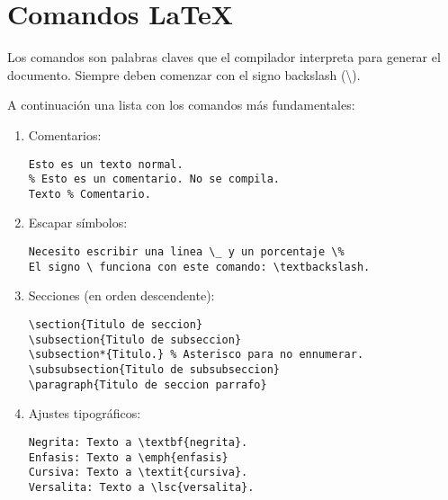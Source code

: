 
\section{Comandos \LaTeX}\label{anexo-latex:listado-comandos-latex}
Los comandos son palabras claves que el compilador interpreta para generar el documento. Siempre deben comenzar con el signo backslash (\textbackslash).

\noindent A continuación una lista con los comandos más fundamentales:

\begin{enumerate}
\item Comentarios:
\lstset{style=latex}
\begin{lstlisting}
Esto es un texto normal.
% Esto es un comentario. No se compila.
Texto % Comentario.
\end{lstlisting}
\item Escapar símbolos:
\begin{lstlisting}
Necesito escribir una linea \_ y un porcentaje \%
El signo \ funciona con este comando: \textbackslash.
\end{lstlisting}
\item Secciones (en orden descendente):
\begin{lstlisting}
\section{Titulo de seccion}
\subsection{Titulo de subseccion}
\subsection*{Titulo.} % Asterisco para no ennumerar.
\subsubsection{Titulo de subsubseccion}
\paragraph{Titulo de seccion parrafo}
\end{lstlisting}
\item Ajustes tipográficos:
\begin{lstlisting}
Negrita: Texto a \textbf{negrita}.
Enfasis: Texto a \emph{enfasis}
Cursiva: Texto a \textit{cursiva}.
Versalita: Texto a \lsc{versalita}.
\end{lstlisting}


\end{enumerate}
